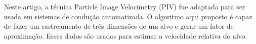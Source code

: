 Neste artigo, a técnica Particle Image Velocimetry (PIV) fue adaptada 
para ser usada em sistemas de condução automatizada.
O algoritmo aqui proposto é capaz de fazer um rastreamento de três dimensões 
de um alvo e gerar um fator de aproximação. 
Esses dados são usados para estimar a velocidade relativa do alvo.